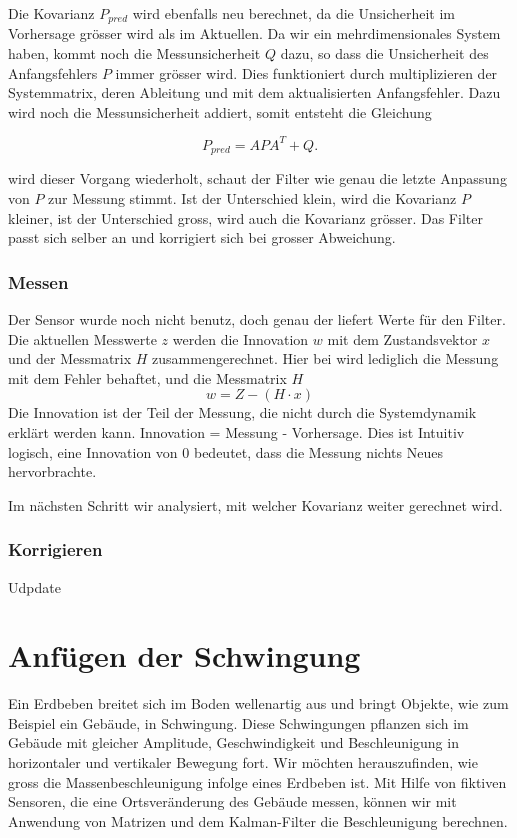 Die Kovarianz $P_{pred}$ wird ebenfalls neu berechnet, da die Unsicherheit im Vorhersage grösser wird als im Aktuellen. Da wir ein mehrdimensionales System haben, kommt noch die Messunsicherheit $Q$ dazu, so dass die Unsicherheit des Anfangsfehlers $P$ immer grösser wird. Dies funktioniert durch multiplizieren der Systemmatrix, deren Ableitung und mit dem aktualisierten Anfangsfehler. Dazu wird noch die Messunsicherheit addiert, somit entsteht die Gleichung

\begin{equation}
{P_{pred}}=APA^T+Q.
\end{equation}

wird dieser Vorgang wiederholt, schaut der Filter wie genau die letzte Anpassung von $P$ zur Messung stimmt. Ist der Unterschied klein, wird die Kovarianz $P$ kleiner, ist der Unterschied gross, wird auch die Kovarianz grösser. Das Filter passt sich selber an und korrigiert sich bei grosser Abweichung.

\subsubsection*{Messen}
Der Sensor wurde noch nicht benutz, doch genau der liefert Werte für den Filter. Die aktuellen Messwerte $z$ werden die Innovation $w$ mit dem Zustandsvektor $x$ und der Messmatrix $H$ zusammengerechnet.
Hier bei wird lediglich die Messung mit dem Fehler behaftet, und die Messmatrix $H$ 
\begin{equation}
w=Z-(H\cdot x)
\end{equation}
Die Innovation ist der Teil der Messung, die nicht durch die Systemdynamik erklärt werden kann. 
Innovation = Messung - Vorhersage. Dies ist Intuitiv logisch, eine Innovation von 0 bedeutet, dass die Messung nichts Neues hervorbrachte.

Im nächsten Schritt wir analysiert, mit welcher Kovarianz weiter gerechnet wird. 

\subsubsection*{Korrigieren}
Udpdate
\section{Anfügen der Schwingung}

Ein Erdbeben breitet sich im Boden wellenartig aus und bringt Objekte, wie zum Beispiel ein Gebäude, in Schwingung.
Diese Schwingungen pflanzen sich im Gebäude mit gleicher Amplitude, Geschwindigkeit und Beschleunigung in horizontaler und vertikaler Bewegung fort.
Wir möchten herauszufinden, wie gross die Massenbeschleunigung infolge eines Erdbeben ist.
Mit Hilfe von fiktiven Sensoren, die eine Ortsveränderung des Gebäude messen, können wir mit Anwendung von Matrizen und dem Kalman-Filter die Beschleunigung berechnen.

